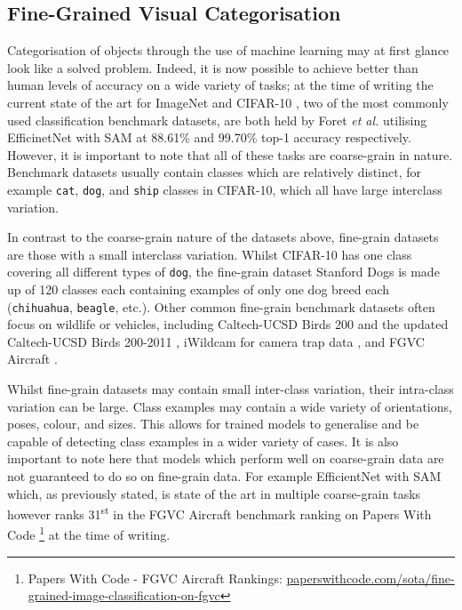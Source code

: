 \subsection{Fine-Grained Visual Categorisation}\label{ch:Background,sec:Fine-grainedCV}

Categorisation of objects through the use of machine learning may at first glance look like a solved problem. Indeed, it is now possible to achieve better than human levels of accuracy on a wide variety of tasks; at the time of writing the current state of the art for ImageNet \cite{institute_of_electrical_and_electronics_engineers_2009_2009} and CIFAR-10 \cite{krizhevsky_learning_2009}, two of the most commonly used classification benchmark datasets, are both held by Foret \textit{et al.} utilising EfficinetNet with SAM \cite{foret_sharpness-aware_2020} at 88.61\% and 99.70\% top-1 accuracy respectively. However, it is important to note that all of these tasks are coarse-grain in nature. Benchmark datasets usually contain classes which are relatively distinct, for example \texttt{cat}, \texttt{dog}, and \texttt{ship} classes in CIFAR-10, which all have large interclass variation. 

In contrast to the coarse-grain nature of the datasets above, fine-grain datasets are those with a small interclass variation. Whilst CIFAR-10 has one class covering all different types of \texttt{dog}, the fine-grain dataset Stanford Dogs \cite{khosla_novel_2011} is made up of 120 classes each containing examples of only one dog breed each (\texttt{chihuahua}, \texttt{beagle}, etc.). Other common fine-grain benchmark datasets often focus on wildlife or vehicles, including Caltech-UCSD Birds 200 \cite{welinder_caltech-ucsd_2010} and the updated Caltech-UCSD Birds 200-2011 \cite{wah_caltech-ucsd_2011}, iWildcam for camera trap data \cite{beery_iwildcam_2019}, and FGVC Aircraft \cite{maji_fine-grained_2013}. 

Whilst fine-grain datasets may contain small inter-class variation, their intra-class variation can be large. Class examples may contain a wide variety of orientations, poses, colour, and sizes. This allows for trained models to generalise and be capable of detecting class examples in a wider variety of cases. It is also important to note here that models which perform well on coarse-grain data are not guaranteed to do so on fine-grain data. For example EfficientNet with SAM which, as previously stated, is state of the art in multiple coarse-grain tasks however ranks 31\textsuperscript{st} in the FGVC Aircraft benchmark ranking on Papers With Code \footnote{Papers With Code - FGVC Aircraft Rankings: \href{https://paperswithcode.com/sota/fine-grained-image-classification-on-fgvc}{paperswithcode.com/sota/fine-grained-image-classification-on-fgvc}} at the time of writing.

